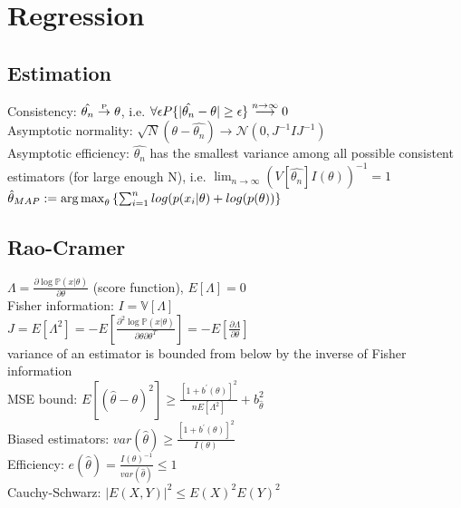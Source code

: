 \section{Regression}
\subsection*{Estimation}
Consistency: $\hat{\theta_n} \stackrel{\text{\tiny P}}{\rightarrow} \theta$,
i.e. $\forall\epsilon P \{|\hat{\theta_n}-\theta| \geq\epsilon\} \stackrel{\tiny n \to\infty}{\longrightarrow} 0 $\\
Asymptotic normality: $\sqrt{N}(\theta - \hat{\theta_n}) \to \mathcal{N}(0, J^{-1}IJ^{-1})$ \\
Asymptotic efficiency: $\hat{\theta_n}$ has the smallest variance among all possible consistent estimators (for large enough N), i.e. $\lim_{n\to\infty} (V[\hat{\theta_n}]I(\theta))^{-1} = 1$
	$\hat{\theta}_{MAP} := \operatorname*{arg\,max}_\theta \left \{ \sum_{i=1}^n log(p(x_i | \theta) + log(p(\theta)) \right\}$
\subsection*{Rao-Cramer}
$\Lambda = \frac{\partial \log \mathbb{P}(x|\theta )}{\partial \theta}$ (score function), $E[\Lambda ]=0$\\
Fisher information: $I= \mathbb{V}[\Lambda]$ \\
$J= E[\Lambda^{2}]= -E[\frac{\partial^2 \log \mathbb{P}(x|\theta ) }{\partial \theta \partial \theta ^{T}}]= -E[\frac{\partial \Lambda}{\partial \theta}]$ \\
variance of an estimator is bounded from below by the inverse of Fisher information \\
MSE bound: $E[(\hat \theta -\theta )^{2}] \geq \frac{[1 + b^{\prime} (\theta)]^{2}}{n E[\Lambda ^{2}]} + b_{\hat \theta}^{2}$ \\
Biased estimators: $var(\hat{\theta}) \geq \frac{[1 + b^{\prime}(\theta)]^2}{I(\theta)}$ \\
Efficiency: $e(\hat{\theta}) = \frac{I(\theta)^{-1}}{var(\hat{\theta})} \leq 1$ \\
Cauchy-Schwarz: $|E(X,Y)|^2 \leq E(X)^2 E(Y)^2$ 

